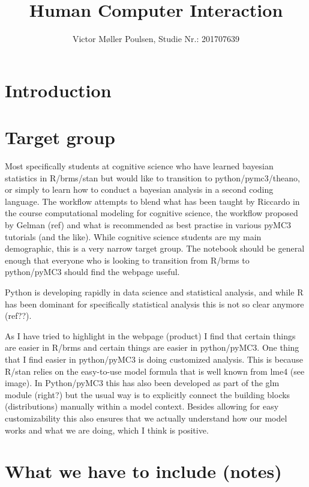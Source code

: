 \documentclass[12pt]{article}
\title{Human Computer Interaction}
\author{Victor Møller Poulsen, Studie Nr.: 201707639}
\begin{document}
\maketitle
\leavevmode

\section{Introduction}

\section{Target group}

Most specifically students at cognitive science who have learned
bayesian statistics in R/brms/stan but would like to transition
to python/pymc3/theano, or simply to learn how to conduct a bayesian
analysis in a second coding language. The workflow attempts to blend what has been
taught by Riccardo in the course computational modeling for cognitive
science, the workflow proposed by Gelman (ref) and what is recommended
as best practise in various pyMC3 tutorials (and the like). While
cognitive science students are my main demographic, this is a very
narrow target group. The notebook should be general enough that
everyone who is looking to transition from R/brms to python/pyMC3
should find the webpage useful.

Python is developing rapidly in data science and statistical analysis,
and while R has been dominant for specifically statistical analysis
this is not so clear anymore (ref??).

As I have tried to highlight in the webpage (product) I find that certain
things are easier in R/brms and certain things are easier in python/pyMC3.
One thing that I find easier in python/pyMC3 is doing customized analysis.
This is because R/stan relies on the easy-to-use model formula that is well known
from lme4 (see image). In Python/pyMC3 this has also been developed as
part of the glm module (right?) but the usual way is to explicitly connect the
building blocks (distributions) manually within a model context.
Besides allowing for easy customizability this also ensures that we actually
understand how our model works and what we are doing, which I think is
positive.


\section{What we have to include (notes)}
\end{document}
